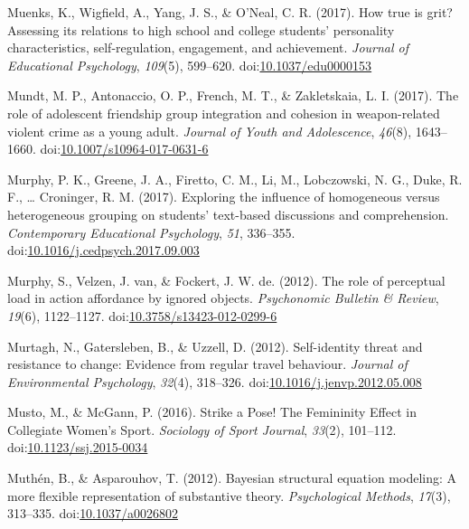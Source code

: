 \documentclass[english,man]{apa6}
\theoremstyle{definition}
\theoremstyle{definition}
\theoremstyle{definition}
\theoremstyle{remark}
\begin{document}
\hypertarget{ref-Muenks2017}{}
Muenks, K., Wigfield, A., Yang, J. S., \& O'Neal, C. R. (2017). How true
is grit? Assessing its relations to high school and college students'
personality characteristics, self-regulation, engagement, and
achievement. \emph{Journal of Educational Psychology}, \emph{109}(5),
599--620.
doi:\href{https://doi.org/10.1037/edu0000153}{10.1037/edu0000153}

\hypertarget{ref-Mundt2017}{}
Mundt, M. P., Antonaccio, O. P., French, M. T., \& Zakletskaia, L. I.
(2017). The role of adolescent friendship group integration and cohesion
in weapon-related violent crime as a young adult. \emph{Journal of Youth
and Adolescence}, \emph{46}(8), 1643--1660.
doi:\href{https://doi.org/10.1007/s10964-017-0631-6}{10.1007/s10964-017-0631-6}

\hypertarget{ref-Murphy2017}{}
Murphy, P. K., Greene, J. A., Firetto, C. M., Li, M., Lobczowski, N. G.,
Duke, R. F., \ldots{} Croninger, R. M. (2017). Exploring the influence
of homogeneous versus heterogeneous grouping on students' text-based
discussions and comprehension. \emph{Contemporary Educational
Psychology}, \emph{51}, 336--355.
doi:\href{https://doi.org/10.1016/j.cedpsych.2017.09.003}{10.1016/j.cedpsych.2017.09.003}

\hypertarget{ref-Murphy2012}{}
Murphy, S., Velzen, J. van, \& Fockert, J. W. de. (2012). The role of
perceptual load in action affordance by ignored objects.
\emph{Psychonomic Bulletin \& Review}, \emph{19}(6), 1122--1127.
doi:\href{https://doi.org/10.3758/s13423-012-0299-6}{10.3758/s13423-012-0299-6}

\hypertarget{ref-Murtagh2012}{}
Murtagh, N., Gatersleben, B., \& Uzzell, D. (2012). Self-identity threat
and resistance to change: Evidence from regular travel behaviour.
\emph{Journal of Environmental Psychology}, \emph{32}(4), 318--326.
doi:\href{https://doi.org/10.1016/j.jenvp.2012.05.008}{10.1016/j.jenvp.2012.05.008}

\hypertarget{ref-Musto2016}{}
Musto, M., \& McGann, P. (2016). Strike a Pose! The Femininity Effect in
Collegiate Women's Sport. \emph{Sociology of Sport Journal},
\emph{33}(2), 101--112.
doi:\href{https://doi.org/10.1123/ssj.2015-0034}{10.1123/ssj.2015-0034}

\hypertarget{ref-Muthen2012}{}
Muthén, B., \& Asparouhov, T. (2012). Bayesian structural equation
modeling: A more flexible representation of substantive theory.
\emph{Psychological Methods}, \emph{17}(3), 313--335.
doi:\href{https://doi.org/10.1037/a0026802}{10.1037/a0026802}
\end{document}
